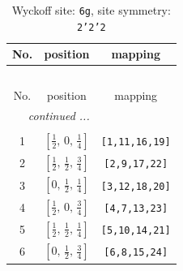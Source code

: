 \documentclass[fleqn,8pt]{jsarticle}
\begin{document}
\renewcommand{\arraystretch}{1.2}
\begin{longtable}{ccc}
\caption{Wyckoff site: {\tt 6g}, site symmetry: {\tt 2'2'2}}
 \\
 \hline \hline
No. & position & mapping \\ \hline \endfirsthead

\multicolumn{2}{l}{\tablename\ \thetable{}} \\
 \hline \hline
No. & position & mapping \\ \hline \endhead

 \hline \hline
\multicolumn{2}{r}{\footnotesize\it continued ...} \\ \endfoot

 \hline \hline
\multicolumn{2}{r}{} \\ \endlastfoot

1 & $\left[ \frac{1}{2},\, 0,\, \frac{1}{4} \right]$ & {\tt [1,11,16,19]} \\ \hline
2 & $\left[ \frac{1}{2},\, \frac{1}{2},\, \frac{3}{4} \right]$ & {\tt [2,9,17,22]} \\ \hline
3 & $\left[ 0,\, \frac{1}{2},\, \frac{1}{4} \right]$ & {\tt [3,12,18,20]} \\ \hline
4 & $\left[ \frac{1}{2},\, 0,\, \frac{3}{4} \right]$ & {\tt [4,7,13,23]} \\ \hline
5 & $\left[ \frac{1}{2},\, \frac{1}{2},\, \frac{1}{4} \right]$ & {\tt [5,10,14,21]} \\ \hline
6 & $\left[ 0,\, \frac{1}{2},\, \frac{3}{4} \right]$ & {\tt [6,8,15,24]} \\
\end{longtable}
\renewcommand{\arraystretch}{1.2}
\end{document}
